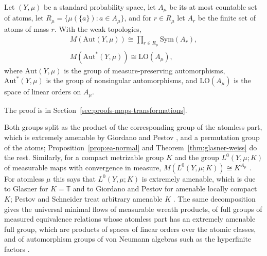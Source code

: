 \begin{theorem}\label{thm:lupini-aut-measure}
Let $(Y,\mu)$ be a standard probability space, let $A_\mu$ be its at most
countable set of atoms, let $R_\mu=\{\mu(\{a\}) : a\in A_\mu\}$, and for
$r\in R_\mu$ let $A_r$ be the finite set of atoms of mass $r$. With the weak
topologies,
\[
\begin{gathered}
M(\mathrm{Aut}(Y,\mu))\cong\prod_{r\in R_\mu}\mathrm{Sym}(A_r),\\
M(\mathrm{Aut}^*(Y,\mu))\cong\mathrm{LO}(A_\mu),
\end{gathered}
\]
where $\mathrm{Aut}(Y,\mu)$ is the group of measure-preserving automorphisms,
$\mathrm{Aut}^*(Y,\mu)$ is the group of nonsingular automorphisms, and
$\mathrm{LO}(A_\mu)$ is the space of linear orders on $A_\mu$.
\end{theorem}

The proof is in Section~\ref{sec:proofs-maps-transformations}.

\begin{remark}\label{rem:lupini-aut-measure}
Both groups split as the product of the corresponding group of the atomless
part, which is extremely amenable by Giordano and Pestov
\cite{GiordanoPestov2002}, and a permutation group of the atoms;
Proposition~\ref{prop:ea-normal} and Theorem~\ref{thm:glasner-weiss} do the
rest. Similarly, for a compact metrizable group $K$ and the group
$L^0(Y,\mu;K)$ of measurable maps with convergence in measure,
$M(L^0(Y,\mu;K))\cong K^{A_\mu}$ \cite[Proposition~3.1]{LupiniPointwise2026}.
For atomless $\mu$ this says that $L^0(Y,\mu;K)$ is extremely amenable, which
is due to Glasner for $K=\mathbb{T}$ and to Giordano and Pestov for amenable
locally compact $K$; Pestov and Schneider treat arbitrary amenable $K$
\cite{Glasner1998,GiordanoPestov2007,PestovSchneider2017}. The same decomposition gives the
universal minimal flows of measurable wreath products, of full groups of
measured equivalence relations whose atomless part has an extremely amenable
full group, which are products of spaces of linear orders over the atomic
classes, and of automorphism groups of von Neumann algebras such as the
hyperfinite factors \cite[Sections~4 and~5]{LupiniPointwise2026}.
\end{remark}

